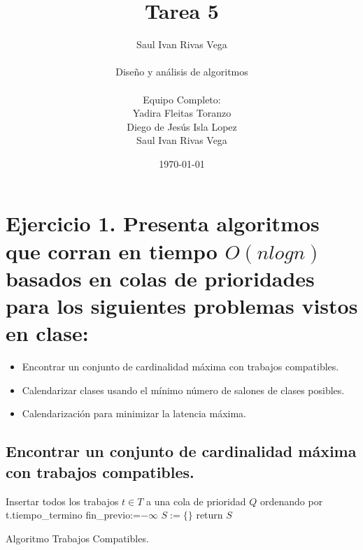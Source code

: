 \documentclass[12pt]{article}
\title{Tarea 5}
\author{
	Saul Ivan Rivas Vega \\
	\\
	Diseño y análisis de algoritmos\\
\\
	Equipo Completo:\\
		Yadira Fleitas Toranzo\\
		Diego de Jesús Isla Lopez\\
		Saul Ivan Rivas Vega\\
}
\date{\today}
\begin{document}
	\maketitle
	\pagebreak
	\section{Ejercicio 1. Presenta algoritmos que corran en tiempo $O(n logn)$ basados en colas de prioridades para los siguientes problemas vistos en clase:}
	\begin{itemize}
		\item Encontrar un conjunto de cardinalidad máxima con trabajos compatibles.
		\item Calendarizar clases usando el mínimo número de salones de clases posibles.
		\item Calendarización para minimizar la latencia máxima.
	\end{itemize}
\subsection{Encontrar un conjunto de cardinalidad máxima con trabajos compatibles.}
		\begin{algorithm}[H]\small
		\SetAlgoLined
		Insertar todos los trabajos $t \in T$ a una cola de prioridad $Q$ ordenando por t.tiempo\_termino\;
		fin\_previo:=$-\infty$\;
		$S:=\{\}$\;
		return $S$\;
		\caption{Algoritmo Trabajos Compatibles.}
	\end{algorithm}
\end{document}
